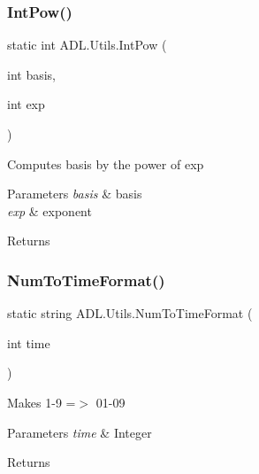 \subsubsection{\texorpdfstring{Int\+Pow()}{IntPow()}}
{\footnotesize\ttfamily static int A\+D\+L.\+Utils.\+Int\+Pow (\begin{DoxyParamCaption}\item[{int}]{basis,  }\item[{int}]{exp }\end{DoxyParamCaption})\hspace{0.3cm}{\ttfamily [static]}}



Computes basis by the power of exp 


\begin{DoxyParams}{Parameters}
{\em basis} & basis\\
\hline
{\em exp} & exponent\\
\hline
\end{DoxyParams}
\begin{DoxyReturn}{Returns}

\end{DoxyReturn}
\mbox{\label{class_a_d_l_1_1_utils_a7f8a756ce7c6c8d4cfe7126ef534e151}} 
\subsubsection{\texorpdfstring{Num\+To\+Time\+Format()}{NumToTimeFormat()}}
{\footnotesize\ttfamily static string A\+D\+L.\+Utils.\+Num\+To\+Time\+Format (\begin{DoxyParamCaption}\item[{int}]{time }\end{DoxyParamCaption})\hspace{0.3cm}{\ttfamily [static]}}



Makes 1-\/9 =$>$ 01-\/09 


\begin{DoxyParams}{Parameters}
{\em time} & Integer\\
\hline
\end{DoxyParams}
\begin{DoxyReturn}{Returns}

\end{DoxyReturn}


